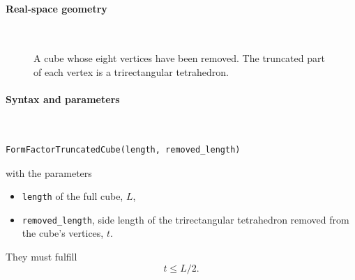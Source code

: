 \paragraph{Real-space geometry}\strut\\

\begin{figure}[H]
\hfill
{}
\hfill
{}
\hfill
{}
\hfill
\caption{A cube whose eight vertices have been removed.
The truncated part of each vertex is a trirectangular tetrahedron.}
\end{figure}

\FloatBarrier

\paragraph{Syntax and parameters}\strut\\[-2ex plus .2ex minus .2ex]
\begin{lstlisting}[language=python, style=eclipseboxed,numbers=none,nolol]
  FormFactorTruncatedCube(length, removed_length)
\end{lstlisting}
with the parameters
\begin{itemize}
\item \texttt{length} of the full cube, $L$,
\item \texttt{removed\_length}, side length of the trirectangular tetrahedron removed from the cube's vertices, $t$.
\end{itemize}
They must fulfill
\begin{displaymath}
  t \le L/2.
\end{displaymath}


